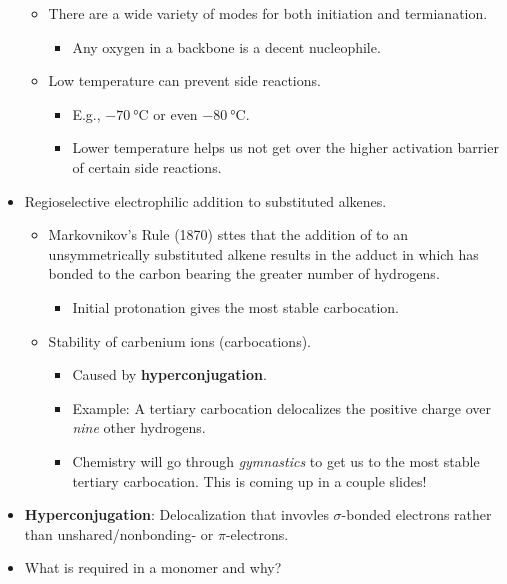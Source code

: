 \documentclass[../notes.tex]{subfiles}
\begin{document}
\begin{itemize}
\begin{itemize}
        \item There are a wide variety of modes for both initiation and termianation.
        \begin{itemize}
            \item Any oxygen in a backbone is a decent nucleophile.
        \end{itemize}
        \item Low temperature can prevent side reactions.
        \begin{itemize}
            \item E.g., $-\SI{70}{\celsius}$ or even $-\SI{80}{\celsius}$.
            \item Lower temperature helps us not get over the higher activation barrier of certain side reactions.
        \end{itemize}
    \end{itemize}
    \item Regioselective electrophilic addition to substituted alkenes.
    \begin{itemize}
        \item Markovnikov's Rule (1870) sttes that the addition of  to an unsymmetrically substituted alkene results in the adduct in which  has bonded to the carbon bearing the greater number of hydrogens.
        \begin{itemize}
            \item Initial protonation gives the most stable carbocation.
        \end{itemize}
        \item Stability of carbenium ions (carbocations).
        \begin{itemize}
            \item Caused by \textbf{hyperconjugation}.
            \item Example: A tertiary carbocation delocalizes the positive charge over \emph{nine} other hydrogens.
            \item Chemistry will go through \emph{gymnastics} to get us to the most stable tertiary carbocation. This is coming up in a couple slides!
        \end{itemize}
    \end{itemize}
    \item \textbf{Hyperconjugation}: Delocalization that invovles $\sigma$-bonded electrons rather than unshared/nonbonding- or $\pi$-electrons.
    \item What is required in a monomer and why?
    \begin{itemize}

\end{itemize}
\end{itemize}
\end{document}
